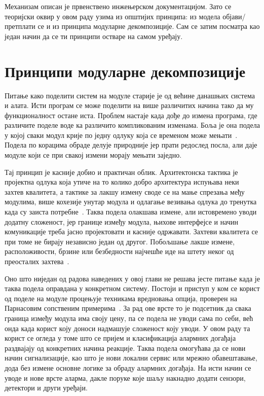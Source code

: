 \documentclass[12pt,oneside]{memoir}
\begin{document}
Механизам  описан је првенствено инжењерском документацијом. Зато се теоријски
оквир у овом раду узима из општијих принципа: из модела објави/претплати се и из принципа
модуларне декомпозиције. Сам  се затим посматра као један начин да се ти принципи
остваре на самом уређају.

\section{Принципи модуларне декомпозиције}

\label{sec:modularnost}


Питање како поделити систем на модуле старије је од већине данашњих система и алата.
Исти програм се може поделити на више различитих начина тако да му функционалност остане
иста. Проблем настаје када дође до измена програма, где различите поделе воде ка различито
компликованим изменама. Боља је
она подела у којој сваки модул крије по једну одлуку која се временом може
мењати~\cite{Parnas1972}. Подела по корацима обраде делује природније јер
прати редослед посла, али даје модуле који се при свакој измени морају мењати
заједно.

Тај принцип је касније добио и практичан облик. Архитектонска тактика је пројектна одлука
која утиче на то колико добро архитектура испуњава неки захтев квалитета, а тактике за лакшу
измену своде се на мање спрезања међу модулима, више кохезије унутар модула и одлагање
везивања одлука до тренутка када су заиста потребне~\cite{Bachmann2007}. Таква подела
олакшава измене, али истовремено уводи додатну сложеност, јер границе између модула,
њихове интерфејсе и начин комуникације треба јасно пројектовати и касније одржавати.
Захтеви квалитета се при томе не бирају независно један од другог. Побољшање лакше измене,
расположивости, брзине или безбедности најчешће иде на штету неког од преосталих
захтева~\cite{Barbacci1995}.

Оно што ниједан од радова наведених у овој глави не решава јесте питање када је таква подела
оправдана у конкретном систему. Постоји и приступ у ком се корист од поделе
на модуле процењује техникама вредновања опција, проверен на Парнасовим
сопственим примерима~\cite{Sullivan2001}. За рад ове врсте то је подсетник
да свака граница између модула има своју цену, па се подела не уводи сама
по себи, већ онда када корист коју доноси надмашује сложеност коју уводи.
У овом раду та корист се огледа у томе што се пријем и класификација
алармних догађаја раздвајају од конкретних начина реакције. Таква подела
омогућава да се нови начин сигнализације, као што је нови локални сервис
или мрежно обавештавање, дода без измене основне логике за обраду
алармних догађаја. На исти начин се уводе и нове врсте аларма, дакле поруке које шаљу
накнадно додати сензори, детектори и други уређаји.
\end{document}
